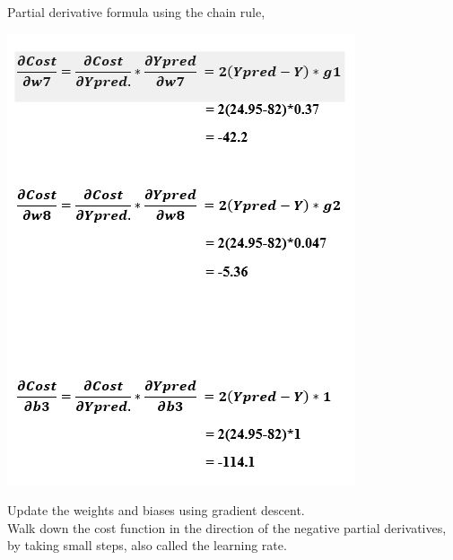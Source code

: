 \documentclass{article}
\begin{document}
Partial derivative formula using the chain rule,
\begin{center}
    \includegraphics[width=0.45\linewidth]{Back Propagation_Partial derivative.JPG}
\end{center}
Update the weights and biases using gradient descent.\\
Walk down the cost function in the direction of the negative partial derivatives, by taking small steps, also called the learning rate.\\
\end{document}
